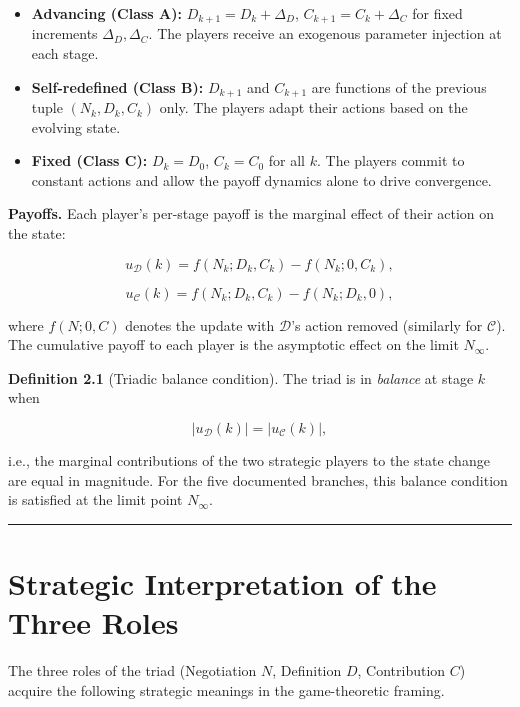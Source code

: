 \documentclass[12pt]{article}
\providecommand{\tightlist}{%
  \setlength{\itemsep}{0pt}\setlength{\parskip}{0pt}}
\begin{document}
\begin{itemize}
\tightlist
\item
  \textbf{Advancing (Class A):} \(D_{k+1} = D_k + \Delta_D\),
  \(C_{k+1} = C_k + \Delta_C\) for fixed increments
  \(\Delta_D, \Delta_C\). The players receive an exogenous parameter
  injection at each stage.
\item
  \textbf{Self-redefined (Class B):} \(D_{k+1}\) and \(C_{k+1}\) are
  functions of the previous tuple \((N_k, D_k, C_k)\) only. The players
  adapt their actions based on the evolving state.
\item
  \textbf{Fixed (Class C):} \(D_k = D_0\), \(C_k = C_0\) for all \(k\).
  The players commit to constant actions and allow the payoff dynamics
  alone to drive convergence.
\end{itemize}

\textbf{Payoffs.} Each player's per-stage payoff is the marginal effect
of their action on the state:

\[u_{\mathcal{D}}(k) = f(N_k; D_k, C_k) - f(N_k; 0, C_k),\]

\[u_{\mathcal{C}}(k) = f(N_k; D_k, C_k) - f(N_k; D_k, 0),\]

where \(f(N; 0, C)\) denotes the update with \(\mathcal{D}\)'s action
removed (similarly for \(\mathcal{C}\)). The cumulative payoff to each
player is the asymptotic effect on the limit \(N_\infty\).

\textbf{Definition 2.1} (Triadic balance condition). The triad is in
\emph{balance} at stage \(k\) when

\[|u_{\mathcal{D}}(k)| = |u_{\mathcal{C}}(k)|,\]

i.e., the marginal contributions of the two strategic players to the
state change are equal in magnitude. For the five documented branches,
this balance condition is satisfied at the limit point \(N_\infty\).

\begin{center}\rule{0.5\linewidth}{0.5pt}\end{center}

\section{Strategic Interpretation of the Three Roles}\label{strategic-interpretation-of-the-three-roles}

The three roles of the triad (Negotiation \(N\), Definition \(D\),
Contribution \(C\)) acquire the following strategic meanings in the
game-theoretic framing.
\end{document}
